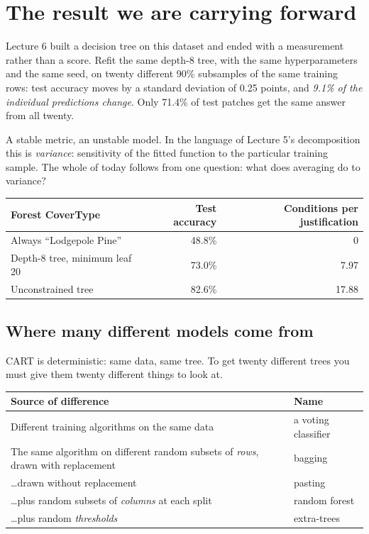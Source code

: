 \documentclass[11pt,a4paper]{article}
\begin{document}

\section{The result we are carrying forward}

Lecture 6 built a decision tree on this dataset and ended with a measurement
rather than a score. Refit the same depth-8 tree, with the same hyperparameters
and the same seed, on twenty different 90\% subsamples of the same training
rows: test accuracy moves by a standard deviation of 0.25 points, and
\emph{9.1\% of the individual predictions change}. Only 71.4\% of test patches
get the same answer from all twenty.

A stable metric, an unstable model. In the language of Lecture 5's
decomposition this is \emph{variance}: sensitivity of the fitted function to
the particular training sample. The whole of today follows from one question:
what does averaging do to variance?

\begin{center}
\small
\begin{tabular}{lrr}
\toprule
\textbf{Forest CoverType} & \textbf{Test accuracy} &
\textbf{Conditions per justification} \\
\midrule
Always ``Lodgepole Pine'' & 48.8\% & 0 \\
Depth-8 tree, minimum leaf 20 & 73.0\% & 7.97 \\
Unconstrained tree & 82.6\% & 17.88 \\
\bottomrule
\end{tabular}
\end{center}

\subsection{Where many different models come from}

CART is deterministic: same data, same tree. To get twenty different trees you
must give them twenty different things to look at.

\begin{center}
\small
\begin{tabular}{p{}l}
\toprule
\textbf{Source of difference} & \textbf{Name} \\
\midrule
Different training algorithms on the same data & a voting classifier \\
The same algorithm on different random subsets of \emph{rows}, drawn with
  replacement & bagging \\
\ldots drawn without replacement & pasting \\
\ldots plus random subsets of \emph{columns} at each split & random forest \\
\ldots plus random \emph{thresholds} & extra-trees \\
\bottomrule
\end{tabular}
\end{center}
\end{document}
